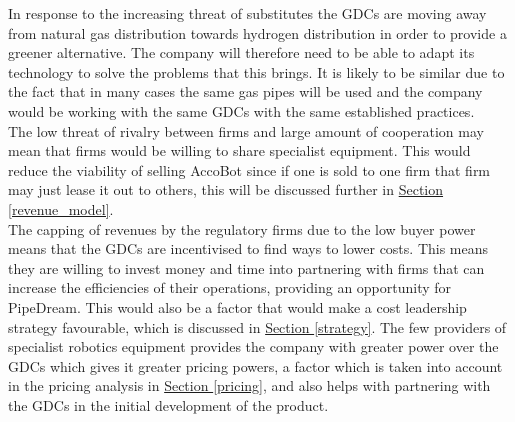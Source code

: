 \documentclass[11pt]{article}		%
\newcommand{\supercite}[1]{\textsuperscript{\cite{#1}}}		%
\newcommand{\sectref}[1]{\hyperref[#1]{Section \ref*{#1}}}     %
\begin{document}
                In response to the increasing threat of substitutes the GDCs are moving away from natural gas distribution towards hydrogen distribution in order to provide a greener alternative. The company will therefore need to be able to adapt its technology to solve the problems that this brings. It is likely to be similar due to the fact that in many cases the same gas pipes will be used and the company would be working with the same GDCs with the same established practices.
                \\ 
                \hspace*{3ex}The low threat of rivalry between firms and large amount of cooperation may mean that firms would be willing to share specialist equipment. This would  reduce the viability of selling AccoBot since if one is sold to one firm that firm may just lease it out to others, this will be discussed further in \sectref{revenue_model}. 
                \\
                \hspace*{3ex}The capping of revenues by the regulatory firms due to the low buyer power means that the GDCs are incentivised to find ways to lower costs. This means they are willing to invest money and time into partnering with firms that can increase the efficiencies of their operations, providing an opportunity for PipeDream. This would also be a factor that would make a cost leadership strategy favourable, which is discussed in \sectref{strategy}.
                The few providers of specialist robotics equipment provides the company with greater power over the GDCs which gives it greater pricing powers, a factor which is taken into account in the pricing analysis in \sectref{pricing}, and also helps with partnering with the GDCs in the initial development of the product.
       
                
\end{document}

